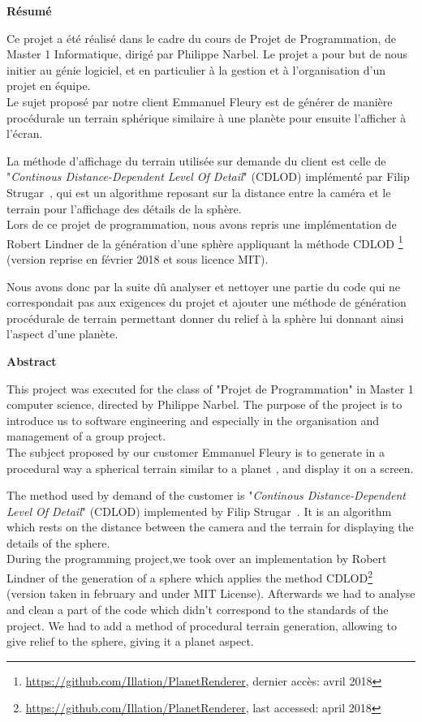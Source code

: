 {\Large
\begin{center}
    \textbf{Résumé}
\end{center}
}

Ce projet a été réalisé dans le cadre du cours de Projet de Programmation, de Master 1 Informatique, dirigé par Philippe Narbel. Le projet a pour but de nous initier au génie logiciel, et en particulier à la gestion et à l'organisation d'un projet en équipe.\\

Le sujet proposé par notre client Emmanuel Fleury est de générer de manière procédurale un terrain sphérique similaire à une planète pour ensuite l’afficher à l’écran.

La méthode d'affichage du terrain utilisée sur demande du client est celle de "\emph{Continous Distance-Dependent Level Of Detail}" (CDLOD) implémenté par Filip Strugar~\cite{CDLOD}, qui est un algorithme reposant sur la distance entre la caméra et le terrain pour l'affichage des détails de la sphère.\\

Lors de ce projet de programmation, nous avons repris une implémentation de Robert Lindner de la génération d'une sphère appliquant la méthode CDLOD \footnote{\url{https://github.com/Illation/PlanetRenderer}, dernier accès: avril 2018} (version reprise en février 2018 et sous licence MIT).

Nous avons donc par la suite dû analyser et nettoyer une partie du code qui ne correspondait pas aux exigences du projet et ajouter une méthode de génération procédurale de terrain permettant donner du relief à la sphère lui donnant ainsi l'aspect d'une planète.

{\Large
\begin{center}
    \textbf{Abstract}
\end{center}
}

This project was executed for the class of "Projet de Programmation" in Master 1 computer science, directed by Philippe Narbel. The purpose of the project is to introduce us to software engineering and especially in the organisation and management of a group project.\\

The subject proposed by our customer Emmanuel Fleury is to generate in a procedural way a spherical terrain similar to a planet , and display it on a screen.

The method used by demand of the customer is "\emph{Continous Distance-Dependent Level Of Detail}" (CDLOD) implemented by Filip Strugar~\cite{CDLOD}. It is an algorithm which rests on the distance between the camera and the terrain for displaying the details of the sphere.\\

During the programming project,we took over an implementation by Robert Lindner of the generation of a sphere which applies the method CDLOD\footnote{\url{https://github.com/Illation/PlanetRenderer}, last accessed: april 2018} (version taken in february and under MIT License).
Afterwards we had to analyse and clean a part of the code which didn't correspond to the standards of the project. We had to add a method of procedural terrain generation, allowing to give relief to the sphere, giving it a planet aspect.